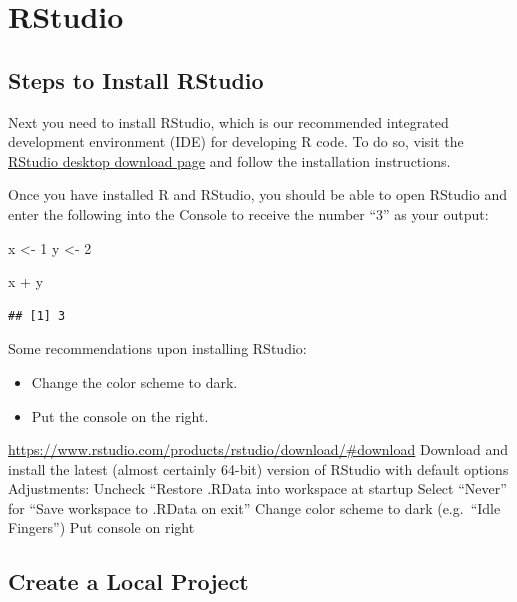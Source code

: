 \documentclass[
]{book}
\newenvironment{Shaded}{\begin{snugshade}}{\end{snugshade}}
\newcommand{\DecValTok}[1]{\textcolor[rgb]{0.00,0.00,0.81}{#1}}
\newcommand{\NormalTok}[1]{#1}
\newcommand{\OtherTok}[1]{\textcolor[rgb]{0.56,0.35,0.01}{#1}}
\newcommand{\SpecialCharTok}[1]{\textcolor[rgb]{0.00,0.00,0.00}{#1}}
\providecommand{\tightlist}{%
  \setlength{\itemsep}{0pt}\setlength{\parskip}{0pt}}
\begin{document}
\hypertarget{rstudio}{%
\section{RStudio}\label{rstudio}}

\hypertarget{steps-to-install-rstudio}{%
\subsection{Steps to Install RStudio}\label{steps-to-install-rstudio}}

Next you need to install RStudio, which is our recommended integrated development environment (IDE) for developing R code. To do so, visit the \href{https://rstudio.com/products/rstudio/download/}{RStudio desktop download page} and follow the installation instructions.

Once you have installed R and RStudio, you should be able to open RStudio and enter the following into the Console to receive the number ``3'' as your output:

\begin{Shaded}
\begin{Highlighting}[]
\NormalTok{x }\OtherTok{\textless{}{-}} \DecValTok{1}
\NormalTok{y }\OtherTok{\textless{}{-}} \DecValTok{2}

\NormalTok{x }\SpecialCharTok{+}\NormalTok{ y}
\end{Highlighting}
\end{Shaded}

\begin{verbatim}
## [1] 3
\end{verbatim}

Some recommendations upon installing RStudio:

\begin{itemize}
\tightlist
\item
  Change the color scheme to dark.
\item
  Put the console on the right.
\end{itemize}

\url{https://www.rstudio.com/products/rstudio/download/\#download}
Download and install the latest (almost certainly 64-bit) version of RStudio with default options
Adjustments:
Uncheck ``Restore .RData into workspace at startup
Select ``Never'' for ``Save workspace to .RData on exit''
Change color scheme to dark (e.g.~``Idle Fingers'')
Put console on right

\hypertarget{create-a-local-project}{%
\subsection{Create a Local Project}\label{create-a-local-project}}
\end{document}
